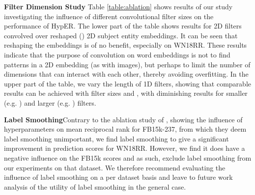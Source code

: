 \documentclass[runningheads]{llncs}
\newcommand{\keypoint}[1]{\vspace{0.1cm}\noindent\textbf{#1}\quad}
\begin{document}
\keypoint{Filter Dimension Study} Table \ref{table:ablation} shows results of our study investigating the influence of different convolutional filter sizes on the performance of HypER. The lower part of the table shows results for 2D filters convolved over reshaped () 2D subject entity embeddings. It can be seen that reshaping the embeddings is of no benefit, especially on WN18RR. These results indicate that the purpose of convolution on word embeddings is not to find patterns in a 2D embedding (as with images), but perhaps to limit the number of dimensions that can interact with each other, thereby avoiding overfitting. In the upper part of the table, we vary the length of 1D filters, showing that comparable results can be achieved with filter sizes  and , with diminishing results for smaller (e.g. ) and larger (e.g. ) filters. 


\begin{table}[!htbp]
	\centering
	\caption{Influence of different filter dimension choices on prediction results.}
     \label{table:ablation}
 \end{table}

\keypoint{Label Smoothing}Contrary to the ablation study of \cite{dettmers2017convolutional}, showing the influence of hyperparameters on mean reciprocal rank for FB15k-237, from which they deem label smoothing unimportant, we find label smoothing to give a significant improvement in prediction scores for WN18RR. However, we find it does have a negative influence on the FB15k scores and as such, exclude label smoothing from our experiments on that dataset. We therefore recommend evaluating the influence of label smoothing on a per dataset basis and leave to future work analysis of the utility of label smoothing in the general case.
\end{document}
